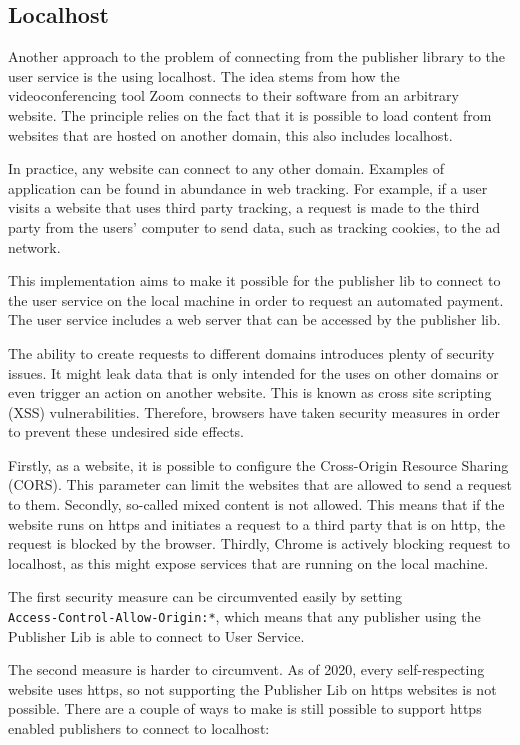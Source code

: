 \subsection{Localhost}

Another approach to the problem of connecting from the publisher library to the user service is the using localhost. The idea stems from how the videoconferencing tool Zoom connects to their software from an arbitrary website. The principle relies on the fact that it is possible to load content from websites that are hosted on another domain, this also includes localhost.

In practice, any website can connect to any other domain. Examples of application can be found in abundance in web tracking. For example, if a user visits a website that uses third party tracking, a request is made to the third party from the users' computer to send data, such as tracking cookies, to the ad network. 

This implementation aims to make it possible for the publisher lib to connect to the user service on the local machine in order to request an automated payment. The user service includes a web server that can be accessed by the publisher lib.

The ability to create requests to different domains introduces plenty of security issues. It might leak data that is only intended for the uses on other domains or even trigger an action on another website. This is known as cross site scripting (XSS) vulnerabilities. Therefore, browsers have taken security measures in order to prevent these undesired side effects.

Firstly, as a website, it is possible to configure the Cross-Origin Resource Sharing (CORS). This parameter can limit the websites that are allowed to send a request to them. Secondly, so-called mixed content is not allowed. This means that if the website runs on https and initiates a request to a third party that is on http, the request is blocked by the browser. Thirdly, Chrome is actively blocking request to localhost, as this might expose services that are running on the local machine.

The first security measure can be circumvented easily by setting \\\texttt{Access-Control-Allow-Origin:*}, which means that any publisher using the Publisher Lib is able to connect to User Service. 

The second measure is harder to circumvent. As of 2020, every self-respecting website uses https, so not supporting the Publisher Lib on https websites is not possible. There are a couple of ways to make is still possible to support https enabled publishers to connect to localhost:
 
